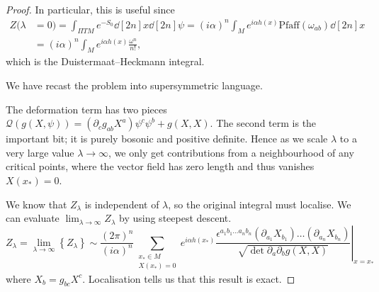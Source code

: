 \begin{proof}
  In particular, this is useful since
  \begin{align}
    Z(\lambda &= 0) = \int_{\Pi T M} e^{-S_0} \dd[2n]{x} \dd[2n]{\psi} = (i \alpha)^n \int_M e^{i \alpha h(x)} \text{Pfaff}(\omega_{ab}) \dd[2n]{x} \\
	      &= (i\alpha)^n \int_M e^{i \alpha h(x)} \frac{\omega^n}{n!},
  \end{align}
  which is the Duistermaat--Heckmann integral.
  \begin{leftbar}
    We have recast the problem into supersymmetric language.
  \end{leftbar}
  \begin{remark}
    The deformation term has two pieces $\mathcal{Q} (g(X, \psi)) = (\partial_{c} g_{ab} X^{a}) \psi^{c} \psi^{b} + g(X, X)$. The second term is the important bit; it is purely bosonic and positive definite. Hence as we scale $\lambda$ to a very large value $\lambda \to \infty$, we only get contributions from a neighbourhood of any critical points, where the vector field has zero length and thus vanishes $X(x_*) = 0$.
  \end{remark}
  We know that $Z_\lambda$ is independent of $\lambda$, so the original integral must localise.
  We can evaluate $\lim_{\lambda \to \infty} Z_\lambda$ by using steepest descent.
  \begin{equation}
  Z_\lambda = \lim_{\lambda \to \infty} \left\{ Z_\lambda \right\} \sim \frac{(2\pi)^n}{(i \alpha)^n} \sum_{\substack{x_* \in M \\ X(x_*) = 0}} e^{i \alpha h(x_*)} \left. \frac{\epsilon^{a_1 b_1 \dots a_n b_n} (\partial_{a_1} X_{b_1}) \dots (\partial_{a_n} X_{b_n})}{\sqrt{\det \partial_{a} \partial_{b} g(X, X)}} \right\rvert_{x = x_*}
  \end{equation}
  where $X_{b} = g_{bc} X^{c}$.
  Localisation tells us that this result is exact.
\end{proof}
